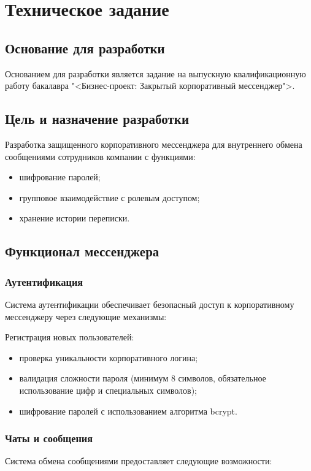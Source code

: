 \section{Техническое задание}
\subsection{Основание для разработки}

Основанием для разработки является задание на выпускную квалификационную работу бакалавра "<Бизнес-проект: Закрытый корпоративный мессенджер">.

\subsection{Цель и назначение разработки}

Разработка защищенного корпоративного мессенджера для внутреннего обмена сообщениями сотрудников компании с функциями:
\begin{itemize}
	\item шифрование паролей;
	\item групповое взаимодействие с ролевым доступом;
	\item хранение истории переписки.
\end{itemize}

	
\subsection{Функционал мессенджера}

\subsubsection{Аутентификация}
Система аутентификации обеспечивает безопасный доступ к корпоративному мессенджеру через следующие механизмы:

Регистрация новых пользователей:

	\begin{itemize}
		\item проверка уникальности корпоративного логина;
		\item валидация сложности пароля (минимум 8 символов, обязательное использование цифр и специальных символов);
		\item шифрование паролей с использованием алгоритма bcrypt.
	\end{itemize}

\subsubsection{Чаты и сообщения}
Система обмена сообщениями предоставляет следующие возможности:

